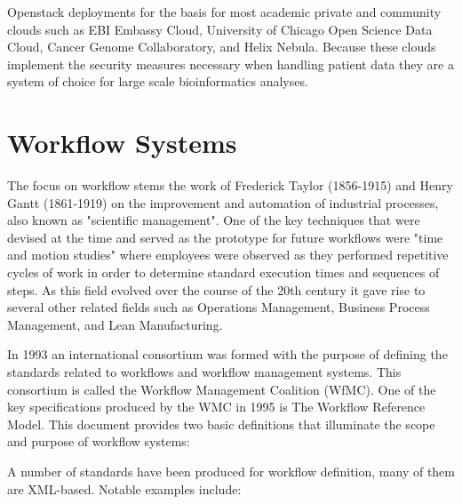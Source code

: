 Openstack deployments for the basis for most academic private and community clouds such as EBI Embassy Cloud\autocite{cook2016european}, University of Chicago Open Science Data Cloud\autocite{grossman2010overview}, Cancer Genome Collaboratory\autocite{yung2016icgc}, and Helix Nebula\autocite{marx2013biology}. Because these clouds implement the security measures necessary when handling patient data they are a system of choice for large scale bioinformatics analyses.

\section{Workflow Systems}

The focus on workflow stems the work of Frederick Taylor (1856-1915) and Henry Gantt (1861-1919) on the improvement and automation of industrial processes, also known as "scientific management"\autocite{taylor2004scientific}. One of the key techniques that were devised at the time and served as the prototype for future workflows were "time and motion studies"\autocite{barnes1949motion} where employees were observed as they performed repetitive cycles of work in order to determine standard execution times and sequences of steps. As this field evolved over the course of the 20th century it gave rise to several other related fields such as Operations Management, Business Process Management, and Lean Manufacturing.

In 1993 an international consortium was formed with the purpose of defining the standards related to workflows and workflow management systems. This consortium is called the Workflow Management Coalition (WfMC). One of the key specifications produced by the WMC in 1995 is The Workflow Reference Model\autocite{hollingsworth1995workflow}. This document provides two basic definitions that illuminate the scope and purpose of  workflow systems:



A number of standards have been produced for workflow definition, many of them are XML-based\autocite{shapiro2002technical}. Notable examples include:

